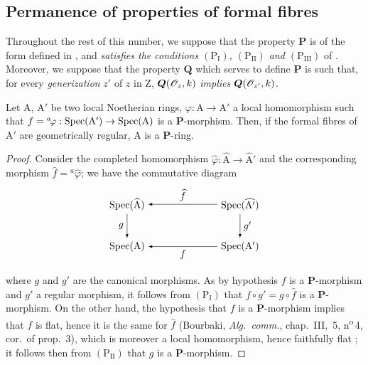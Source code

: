 \subsection{Permanence of properties of formal fibres}
\label{subsection:IV.7.4}

\begin{env}[7.4.1]
\label{IV.7.4.1}
Throughout the rest of this number, we suppose that the property $\boldsymbol{P}$ is of the form defined in , and \emph{satisfies the conditions $(\mathrm{P_I})$, $(\mathrm{P_{II}})$ and $(\mathrm{P_{III}})$} of .
Moreover, we suppose that the property $\boldsymbol{Q}$ which serves to define $\boldsymbol{P}$ is such that, for every \emph{generization} $z'$ of $z$ in $\mathrm{Z}$, $\boldsymbol{Q}(\mathscr{O}_z,k)$ \emph{implies} $\boldsymbol{Q}(\mathscr{O}_{z'},k)$.
\end{env}

\begin{lemma}[7.4.2]
\label{IV.7.4.2}
Let $\mathrm{A}$, $\mathrm{A}'$ be two local Noetherian rings, $\varphi:\mathrm{A}\to\mathrm{A}'$ a local homomorphism such that $f={}^a\!\varphi:\operatorname{Spec}(\mathrm{A}')\to\operatorname{Spec}(\mathrm{A})$ is a $\boldsymbol{P}$-morphism.
Then, if the formal fibres of $\mathrm{A}'$ are geometrically regular, $\mathrm{A}$ is a $\boldsymbol{P}$-ring.
\end{lemma}


\begin{proof}
Consider the completed homomorphism $\widehat{\varphi}:\widehat{\mathrm{A}}\to\widehat{\mathrm{A}}'$ and the corresponding morphism $\widehat{f}={}^a\!\widehat{\varphi}$; we have the commutative diagram
\[
\begin{tikzpicture}[>=latex]
\node (tl) at (0,1.5) {$\Spec(\widehat{\mathrm{A}})$};
\node (tr) at (4,1.5) {$\Spec(\widehat{\mathrm{A}'})$};
\node (bl) at (0,0) {$\Spec(\mathrm{A})$};
\node (br) at (4,0) {$\Spec(\mathrm{A}')$};
\draw[->] (tr) -- node[above] {$\widehat{f}$} (tl);
\draw[->] (tl) -- node[left] {$g$} (bl);
\draw[->] (tr) -- node[right] {$g'$} (br);
\draw[->] (br) -- node[below] {$f$} (bl);
\end{tikzpicture}
\]
where $g$ and $g'$ are the canonical morphisms.
As by hypothesis $f$ is a $\boldsymbol{P}$-morphism and $g'$ a regular morphism, it follows from $(\mathrm{P_I})$ that $f\circ g'=g\circ\widehat{f}$ is a $\boldsymbol{P}$-morphism.
On the other hand, the hypothesis that $f$ is a $\boldsymbol{P}$-morphism implies that $f$ is flat, hence it is the same for $\widehat{f}$ (Bourbaki, \emph{Alg.\ comm.}, chap.~III, \textsection\,5, n\textsuperscript{o}\,4, cor.~of prop.~3), which is moreover a local homomorphism, hence faithfully flat ; it follows then from $(\mathrm{P_{II}})$ that $g$ is a $\boldsymbol{P}$-morphism.
\end{proof}

